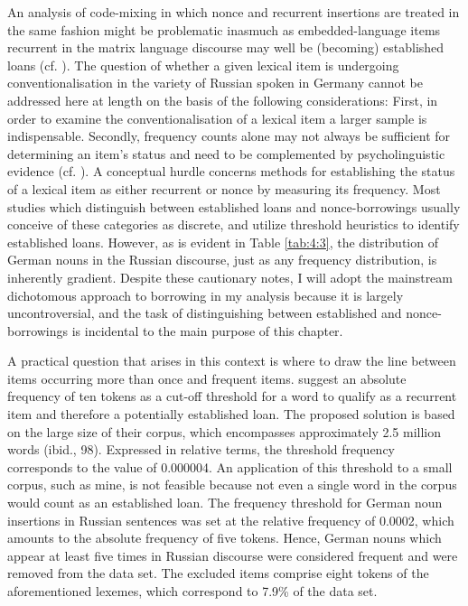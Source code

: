 \begin{sloppypar}
An analysis of code-mixing in which nonce and recurrent insertions are treated in the same fashion might be problematic inasmuch as embedded-language items recurrent in the matrix language discourse may well be (becoming) established loans (cf. \citealt{backus-13,myers-scotton-duelling-1993,poplack-etal-1988,poplack-dion-2012,poplack18}). The question of whether a given lexical item is undergoing conventionalisation in the variety of Russian spoken in Germany cannot be addressed here at length on the basis of the following considerations: First, in order to examine the conventionalisation of a lexical item a larger sample is indispensable. Secondly, frequency counts alone may not always be sufficient for determining an item's status and need to be complemented by psycholinguistic evidence (cf. \citealt{blumenthal}). A conceptual hurdle concerns methods for establishing the status of a lexical item as either recurrent or nonce by measuring its frequency. Most studies which distinguish between established loans and nonce-borrowings usually conceive of these categories as discrete, and utilize threshold heuristics to identify established loans. However, as is evident in Table \ref{tab:4:3}, the distribution of German nouns in the Russian discourse, just as any frequency distribution, is inherently gradient. Despite these cautionary notes, I will adopt the mainstream dichotomous approach to borrowing in my analysis because it is largely uncontroversial, and the task of distinguishing between established and nonce-borrowings is incidental to the main purpose of this chapter.
\end{sloppypar} 

A practical question that arises in this context is where to draw the line between items occurring more than once and frequent items. \citet{poplack-etal-1988} suggest an absolute frequency of ten tokens as a cut-off threshold for a word to qualify as a recurrent item and therefore a potentially established loan. The proposed solution is based on the large size of their corpus, which encompasses approximately 2.5 million words (ibid., 98). Expressed in relative terms, the threshold frequency corresponds to the value of 0.000004. An application of this threshold to a small corpus, such as mine, is not feasible because not even a single word in the corpus would count as an established loan. The frequency threshold for German noun insertions in Russian sentences was set at the relative frequency of 0.0002, which amounts to the absolute frequency of five tokens. Hence, German nouns which appear at least five times in Russian discourse were considered frequent and were removed from the data set. The excluded items comprise eight tokens of the aforementioned lexemes, which correspond to 7.9\% of the data set.

